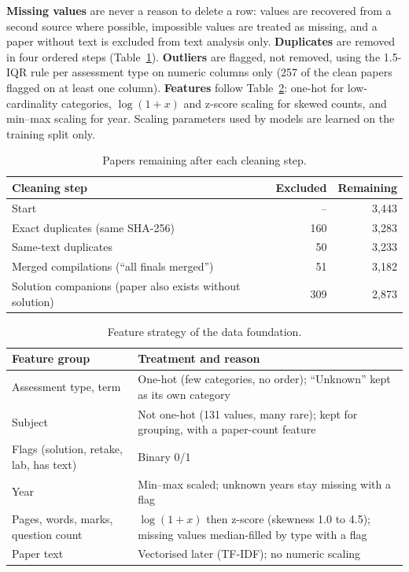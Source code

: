 \documentclass[11pt,a4paper]{article}
\begin{document}
\textbf{Missing values} are never a reason to delete a row: values are recovered from a second source where possible,
impossible values are treated as missing, and a paper without text is excluded from text analysis only. \textbf{Duplicates}
are removed in four ordered steps (Table~\ref{tab:funnel}). \textbf{Outliers} are flagged, not removed, using the 1.5-IQR rule
per assessment type on numeric columns only (257 of the clean papers flagged on at least one column). \textbf{Features}
follow Table~\ref{tab:featstrat}: one-hot for low-cardinality categories, $\log(1+x)$ and z-score scaling for skewed counts, and
min--max scaling for year. Scaling parameters used by models are learned on the training split only.

\begin{table}[!htb]
\centering
\small
\begin{tabular}{lrr}
\toprule
Cleaning step & Excluded & Remaining \\
\midrule
Start & -- & 3{,}443 \\
Exact duplicates (same SHA-256) & 160 & 3{,}283 \\
Same-text duplicates & 50 & 3{,}233 \\
Merged compilations (``all finals merged'') & 51 & 3{,}182 \\
Solution companions (paper also exists without solution) & 309 & 2{,}873 \\
\bottomrule
\end{tabular}
\caption{Papers remaining after each cleaning step.}
\label{tab:funnel}
\end{table}

\begin{table}[!htb]
\centering
\small
\begin{tabular}{p{4.2cm}p{10.8cm}}
\toprule
Feature group & Treatment and reason \\
\midrule
Assessment type, term & One-hot (few categories, no order); ``Unknown'' kept as its own category \\
Subject & Not one-hot (131 values, many rare); kept for grouping, with a paper-count feature \\
Flags (solution, retake, lab, has text) & Binary 0/1 \\
Year & Min--max scaled; unknown years stay missing with a flag \\
Pages, words, marks, question count & $\log(1+x)$ then z-score (skewness 1.0 to 4.5); missing values median-filled by type with a flag \\
Paper text & Vectorised later (TF-IDF); no numeric scaling \\
\bottomrule
\end{tabular}
\caption{Feature strategy of the data foundation.}
\label{tab:featstrat}
\end{table}
\end{document}
